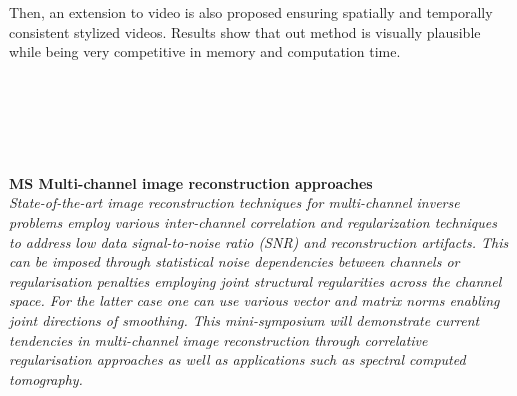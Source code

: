 \begin{multicols}{2}
{Then, an extension to video is also proposed ensuring spatially and temporally consistent stylized videos. Results show that out method is visually plausible while being very competitive in memory and computation time.}\\
\\ 
        \\
        \\\\
\\
\end{multicols}
  \noindent\textbf{MS Multi-channel image reconstruction approaches}\\
  \textit{State-of-the-art image reconstruction techniques for multi-channel inverse problems employ various inter-channel correlation and regularization techniques to address low data signal-to-noise ratio (SNR) and reconstruction artifacts. This can be imposed through statistical noise dependencies between channels or regularisation penalties employing joint structural regularities across the channel space. For the latter case one can use various vector and matrix norms enabling joint directions of smoothing. This mini-symposium will demonstrate current tendencies in multi-channel image reconstruction through correlative regularisation approaches as well as applications such as spectral computed tomography. } \\
    
